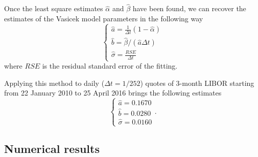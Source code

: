 Once the least square estimates $\widehat{\alpha}$ and $\widehat{\beta}$ have been found, we can recover the estimates of the Vasicek model parameters in the following way
\begin{equation*}
\begin{cases*}
\widehat{a}=\frac{1}{\Delta t}(1-\widehat{\alpha})\\[2ex]
\widehat{b}= \widehat{\beta}/(\widehat{a}\Delta t)\\[2ex]
\widehat{\sigma}=\frac{RSE}{\Delta t}
\end{cases*}
\end{equation*}
where $RSE$ is the residual standard error of the fitting.

Applying this method to daily ($\Delta t = 1/252$) quotes of 3-month LIBOR starting from 22 January 2010 to 25 April 2016 brings the following estimates
\begin{equation*}
\begin{cases*}
\widehat{a}=0.1670\\
\widehat{b}=0.0280 \\
\widehat{\sigma}=0.0160
\end{cases*}.
\end{equation*}














\subsection{Numerical results}



